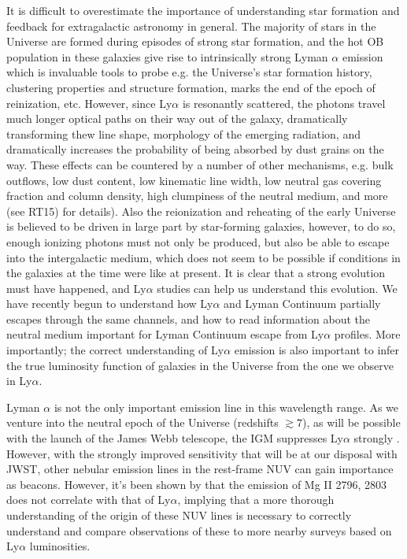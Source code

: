 \documentclass[10pt, letterpaper, headings=Large, DIV=14]{scrartcl}
\begin{document}
It is difficult to overestimate the importance of understanding star formation
and feedback for extragalactic astronomy in general. The majority of stars in
the Universe are formed during episodes of strong star formation, and the hot OB
population in these galaxies give rise to intrinsically strong Lyman $\alpha$
emission which is invaluable tools to probe e.g. the Universe's star formation
history, clustering properties and structure formation, marks the end of the
epoch of reinization, etc. However, since Ly$\alpha$ is resonantly scattered,
the photons travel much longer optical paths on their way out of the galaxy,
dramatically transforming thew line shape, morphology of the emerging radiation,
and dramatically increases the probability of being absorbed by dust grains on
the way. These effects can be countered by a number of other mechanisms, e.g.
bulk outflows, low dust content, low kinematic line width, low neutral gas
covering fraction and column density, high clumpiness of the neutral medium, and
more (see RT15) for details). Also the reionization and reheating of the early
Universe is believed to be driven in large part by star-forming galaxies,
however, to do so, enough ionizing photons must not only be produced, but also
be able to escape into the intergalactic medium, which does not seem to be
possible if conditions in the galaxies at the time were like at present. It is
clear that a strong evolution must have happened, and Ly$\alpha$ studies can
help us understand this evolution. We have recently begun to understand how
Ly$\alpha$ and Lyman Continuum partially escapes through the same channels, and
how to read information about the neutral medium important for Lyman Continuum
escape from Ly$\alpha$ profiles\citep{Verhamme2015}.  More importantly; the
correct understanding of Ly$\alpha$ emission is also important to infer the true
luminosity function of galaxies in the Universe from the one we observe in
Ly$\alpha$.  

Lyman $\alpha$ is not the only important emission line in this
wavelength range. As we venture into the neutral epoch of the Universe
(redshifts $\gtrsim 7$), as will be possible with the launch of the James Webb
telescope, the IGM suppresses Ly$\alpha$ strongly \citep[e.g.][and
references herein]{Laursen2009,Dijkstra2006,DijkstraRev}.  However, with the
strongly improved sensitivity that will be at our disposal with JWST, other
nebular emission lines in the rest-frame NUV can gain importance as beacons.
However, it's been shown by \cite{Rigby2014} that the emission of Mg II 2796,
2803 does not correlate with that of Ly$\alpha$, implying that a more thorough
understanding of the origin of these NUV lines is necessary to correctly
understand and compare observations of these to more nearby surveys based on
Ly$\alpha$ luminosities. 
\end{document}
